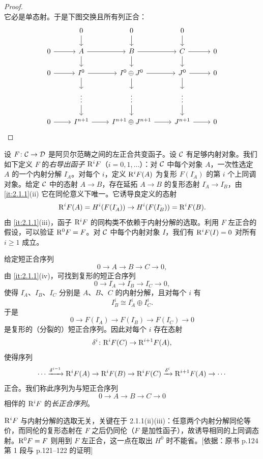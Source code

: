\begin{proof}
\[\]
它必是单态射。于是下图交换且所有列正合：
\[\begin{tikzcd}[column sep=2.4em,row sep=1.5em]
& 0 \arrow[d] & 0 \arrow[d] & 0 \arrow[d] & \\
0 \arrow[r] & A \arrow[r] \arrow[d] & B \arrow[r] \arrow[d] & C \arrow[r] \arrow[d] & 0 \\
0 \arrow[r] & I^0 \arrow[r] \arrow[d] & I^0\oplus J^0 \arrow[r] \arrow[d] & J^0 \arrow[r] \arrow[d] & 0 \\
& \vdots \arrow[d] & \vdots \arrow[d] & \vdots \arrow[d] & \\
0 \arrow[r] & I^{n+1} \arrow[r] & I^{n+1}\oplus J^{n+1} \arrow[r] & J^{n+1} \arrow[r] & 0
\end{tikzcd}\]
\end{proof}

设 $F\colon\mathcal{C}\to\mathcal{D}$ 是阿贝尔范畴之间的左正合共变函子。设 $\mathcal{C}$ 有足够内射对象。我们如下定义 $F$ 的\emph{右导出函子} $\mathrm{R}^iF$（$i=0,1,\dots$）：对 $\mathcal{C}$ 中每个对象 $A$，一次性选定 $A$ 的一个内射分解 $I_A^\cdot$。对每个 $i$，定义 $\mathrm{R}^iF(A)$ 为复形 $F(I_A^\cdot)$ 的第 $i$ 个上同调对象。给定 $\mathcal{C}$ 中的态射 $A\to B$，存在延拓 $A\to B$ 的复形态射 $I_A^\cdot\to I_B^\cdot$，由 \ref{it:2.1.1}(ii) 它在同伦意义下唯一。它诱导良定义的态射
\[
\mathrm{R}^iF(A)=H^i(F(I_A^\cdot))\to H^i(F(I_B^\cdot))=\mathrm{R}^iF(B).
\]
由 \ref{it:2.1.1}(iii)，函子 $\mathrm{R}^iF$ 的同构类不依赖于内射分解的选取。利用 $F$ 左正合的假设，可以验证 $\mathrm{R}^0F=F$。对 $\mathcal{C}$ 中每个内射对象 $I$，我们有 $\mathrm{R}^iF(I)=0$ 对所有 $i\ge1$ 成立。

给定短正合序列
\[
0\to A\to B\to C\to 0,
\]
由 \ref{it:2.1.1}(iv)，可找到复形的短正合序列
\[
0\to I_A^\cdot\to I_B^\cdot\to I_C^\cdot\to 0,
\]
使得 $I_A^\cdot$、$I_B^\cdot$、$I_C^\cdot$ 分别是 $A$、$B$、$C$ 的内射分解，且对每个 $i$ 有
\[
I_B^i\cong I_A^i\oplus I_C^i.
\]
于是
\[
0\to F(I_A^\cdot)\to F(I_B^\cdot)\to F(I_C^\cdot)\to 0
\]
是复形的（分裂的）短正合序列。因此对每个 $i$ 存在态射
\[
\delta^i\colon\mathrm{R}^iF(C)\to\mathrm{R}^{i+1}F(A),
\]
使得序列
\[
\cdots\xrightarrow{\delta^{i-1}}\mathrm{R}^iF(A)\to\mathrm{R}^iF(B)\to\mathrm{R}^iF(C)\xrightarrow{\delta^i}\mathrm{R}^{i+1}F(A)\to\cdots
\]
正合。我们称此序列为与短正合序列
\[
0\to A\to B\to C\to 0
\]
相伴的 $\mathrm{R}^iF$ 的\emph{长正合序列}。
\begin{tnote}
$\mathrm{R}^iF$ 与内射分解的选取无关，关键在于 2.1.1(ii)(iii)：任意两个内射分解同伦等价，而同伦的复形态射在 $F$ 之后仍同伦（$F$ 是加性函子），故诱导相同的上同调态射。$\mathrm{R}^0F=F$ 则用到 $F$ 左正合，这一点在取出 $H^0$ 时不能省。[依据：原书 p.124 第 1 段与 p.121–122 的证明]
\end{tnote}

